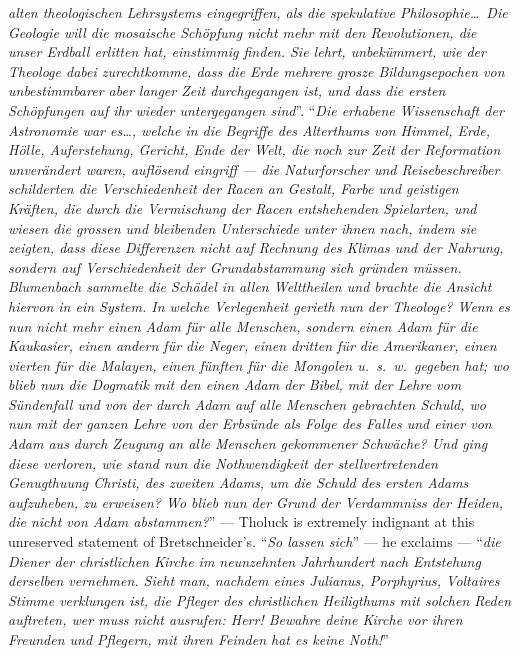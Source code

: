 \documentclass[12pt,a4paper]{article}
\newcommand{\opage}[1]{\marginnote{\footnotesize\textit{[#1]}}}
\begin{document}
\opage{36}\textit{alten theologischen Lehrsystems eingegriffen, als die
spekulative Philosophie\ldots\ Die Geologie will die mosaische
Schöpfung nicht mehr mit den Revolutionen, die unser Erdball erlitten
hat, einstimmig finden. Sie lehrt, unbekümmert, wie der Theologe dabei
zurechtkomme, dass die Erde mehrere grosze Bildungsepochen von
unbestimmbarer aber langer Zeit durchgegangen ist, und dass die ersten
Schöpfungen auf ihr wieder untergegangen sind}''. ``\textit{Die
erhabene Wissenschaft der Astronomie war es\ldots, welche in die
Begriffe des Alterthums von Himmel, Erde, Hölle, Auferstehung,
Gericht, Ende der Welt, die noch zur Zeit der Reformation unverändert
waren, auflösend eingriff --- die Naturforscher und Reisebeschreiber
schilderten die Verschiedenheit der Racen an Gestalt, Farbe und
geistigen Kräften, die durch die Vermischung der Racen entshehenden
Spielarten, und wiesen die grossen und bleibenden Unterschiede unter
ihnen nach, indem sie zeigten, dass diese Differenzen nicht auf
Rechnung des Klimas und der Nahrung, sondern auf \emph{Verschiedenheit
der Grundabstammung} sich gründen müssen. \emph{Blumenbach} sammelte
die Schädel in allen Welttheilen und brachte die Ansicht hiervon in
ein System. In welche Verlegenheit gerieth nun der Theologe? Wenn es
nun nicht mehr \emph{einen} Adam für alle Menschen, sondern einen Adam
für die Kaukasier, einen andern für die Neger, einen dritten für die
Amerikaner, einen vierten für die Malayen, einen fünften für die
Mongolen u.\ s.\ w.\ gegeben hat; wo blieb nun die Dogmatik mit den
\emph{einen} Adam der Bibel, mit der Lehre vom Sündenfall und von der
durch Adam auf alle Menschen gebrachten Schuld, wo nun mit der ganzen
Lehre von der Erbsünde als Folge des Falles und einer von Adam aus
durch Zeugung an alle Menschen gekommener Schwäche? Und ging diese
verloren, wie stand nun die Nothwendigkeit der stellvertretenden
Genugthuung Christi, des zweiten Adams, um die Schuld des ersten Adams
aufzuheben, zu erweisen? Wo blieb nun der Grund der Verdammniss der
Heiden, die nicht von Adam abstammen?}'' ---
Tholuck is extremely indignant at this unreserved statement of
Bretschneider's. ``\textit{So lassen sich}'' --- he exclaims ---
``\textit{die}
\opage{37}\textit{Diener der christlichen Kirche im neunzehnten
Jahrhundert nach Entstehung derselben vernehmen. Sieht man, nachdem
eines \emph{Julianus}, \emph{Porphyrius}, \emph{Voltaires} Stimme
verklungen ist, die Pfleger \emph{des christlichen Heiligthums} mit
solchen Reden auftreten, wer muss nicht ausrufen: Herr! Bewahre deine
Kirche vor ihren Freunden und Pflegern, mit ihren Feinden hat es keine
Noth!}''
\end{document}

